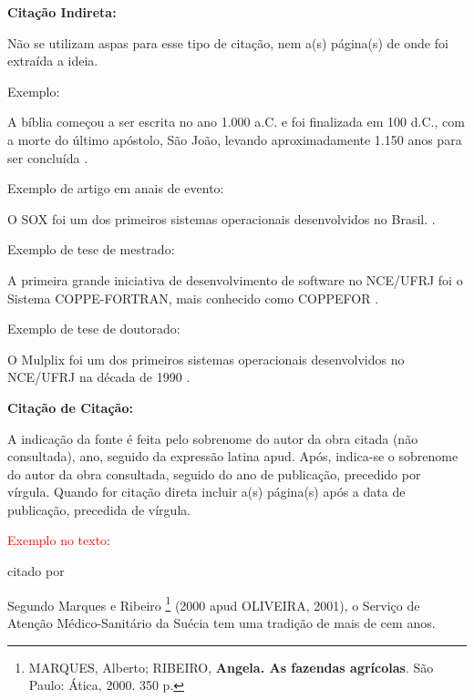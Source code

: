     \clearpage

    {\centering\bfseries\color{red} Citação Indireta: \par}

    \bigskip
    Não se utilizam aspas para esse tipo de citação, nem a(s) página(s) de onde foi extraída a ideia.

    \bigskip
    {\color{red} Exemplo:}
    \bigskip

    A bíblia começou a ser escrita no ano 1.000 a.C. e foi finalizada em 100 d.C., com a morte do último apóstolo, São João, levando aproximadamente 1.150 anos para ser concluída \cite{book:GHELLER}.

    \bigskip
    {\color{red} Exemplo de artigo em anais de evento:}
    \bigskip

    O SOX foi um dos primeiros sistemas operacionais desenvolvidos no Brasil. \cite{Sox2012}.

    \bigskip

    {\color{red} Exemplo de tese de mestrado:}

    \bigskip

    A primeira grande iniciativa de desenvolvimento de software no NCE/UFRJ foi o Sistema COPPE-FORTRAN, mais conhecido como COPPEFOR \cite{Salenbauch72}.

    \bigskip
    {\color{red} Exemplo de tese de doutorado:}

    \bigskip
    O Mulplix foi um dos primeiros sistemas operacionais desenvolvidos no NCE/UFRJ na década de 1990 \cite{Azevedo93}.

    \bigskip

    {\centering\bfseries\color{red} Citação de Citação: \par}

    \bigskip

    A indicação da fonte é feita pelo sobrenome do autor da obra citada (não consultada), ano, seguido da expressão latina apud. Após, indica-se o sobrenome do autor da obra consultada, seguido do ano de publicação, precedido por vírgula. Quando for citação direta incluir a(s) página(s) após a data de publicação, precedida de vírgula.

    \bigskip

    \textcolor{red}{Exemplo no texto}:

    \bigskip

    citado por

    \bigskip

    \begin{sloppypar}
      Segundo Marques e Ribeiro \footnote{MARQUES, Alberto; RIBEIRO, \textbf{Angela. As fazendas agrícolas}. São Paulo: Ática, 2000. 350 p.} (2000 apud OLIVEIRA, 2001),  o Serviço de Atenção Médico-Sanitário da Suécia tem uma tradição de mais de cem anos.
    \end{sloppypar}

